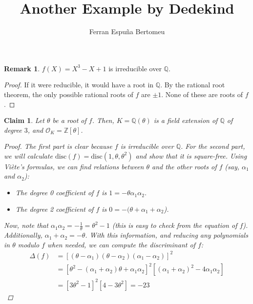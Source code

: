 \documentclass[11pt]{article}
\title{Another Example by Dedekind}
\author{Ferran Espuña Bertomeu}
\newtheorem{claim}[theorem]{Claim}
\theoremstyle{definition}
\newtheorem*{rk}{Remark}
\begin{document}
    \maketitle

    \begin{rk}
        $f(X)=X^3-X+1$ is irreducible over $\mathbb{Q}$.
        \begin{proof}
            If it were reducible, it would have a root in $\mathbb{Q}$.
            By the rational root theorem, the only possible rational roots of  $f$ are $\pm 1$.
            None of these are roots of $f$.
        \end{proof}
    \end{rk}

    \begin{claim}
        Let $\theta$ be a root of $f$.
        Then, $K = \mathbb{Q}(\theta)$ is a field extension
        of $\mathbb{Q}$ of degree $3$,
        and $\mathcal{O}_K = \mathbb{Z}[\theta]$.

        \begin{proof}
            The first part is clear because $f$ is irreducible over $\mathbb{Q}$.
            For the second part, we will calculate $\text{disc}(f) = \text{disc}(1, \theta, \theta^2)$
            and show that it is square-free.
            Using Viète's formulas, we can find relations between $\theta$ and the other roots of $f$ (say, $\alpha_1$ and $\alpha_2$):
            \begin{itemize}
                \item The degree 0 coefficient of $f$ is $1 = - \theta \alpha_1 \alpha_2$.
                \item The degree 2 coefficient of $f$ is $0 = - (\theta + \alpha_1 + \alpha_2$).
            \end{itemize}
            Now, note that $\alpha_1 \alpha_2 = -\frac{1}{\theta} = \theta^2 - 1$ (this is easy to check from the equation of $f$).
            Additionally, $\alpha_1 + \alpha_2 = -\theta$.
            With this information, and reducing any polynomials in $\theta$ modulo $f$ when needed,
            we can compute the discriminant of $f$:
            \begin{align*}
                \Delta(f) &= [(\theta-\alpha_1) (\theta-\alpha_2) (\alpha_1 - \alpha_2)]^2 \\
                &= [\theta^2 - (\alpha_1 + \alpha_2) \theta + \alpha_1 \alpha_2]^2[(\alpha_1 + \alpha_2)^2 - 4 \alpha_1 \alpha_2] \\
                &= [3\theta^2-1]^2[4-3\theta^2] = -23
            \end{align*}
        \end{proof}
    \end{claim}
\end{document}
